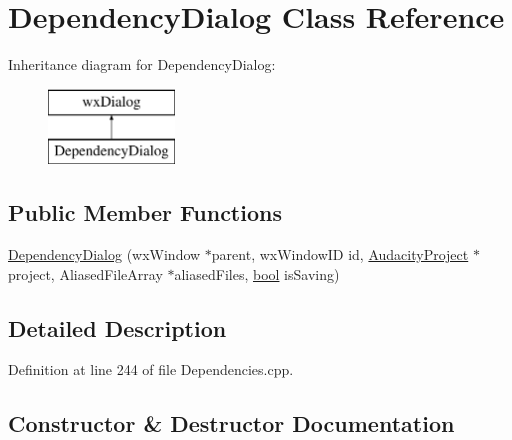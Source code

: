 \hypertarget{class_dependency_dialog}{}\section{Dependency\+Dialog Class Reference}
\label{class_dependency_dialog}
Inheritance diagram for Dependency\+Dialog\+:\begin{figure}[H]
\begin{center}
\leavevmode
\includegraphics[height=2.000000cm]{class_dependency_dialog}
\end{center}
\end{figure}
\subsection*{Public Member Functions}
\begin{DoxyCompactItemize}
\item 
\hyperlink{class_dependency_dialog_a9c6a91335cc01c1e4c36046f13b17c42}{Dependency\+Dialog} (wx\+Window $\ast$parent, wx\+Window\+ID id, \hyperlink{class_audacity_project}{Audacity\+Project} $\ast$project, Aliased\+File\+Array $\ast$aliased\+Files, \hyperlink{mac_2config_2i386_2lib-src_2libsoxr_2soxr-config_8h_abb452686968e48b67397da5f97445f5b}{bool} is\+Saving)
\end{DoxyCompactItemize}


\subsection{Detailed Description}


Definition at line 244 of file Dependencies.\+cpp.



\subsection{Constructor \& Destructor Documentation}
